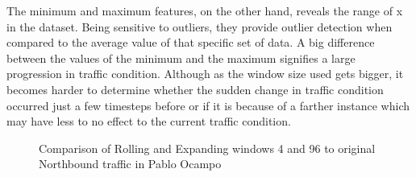
The minimum and maximum features, on the other hand, reveals the range of x in the dataset. Being sensitive to outliers, they provide outlier detection when compared to the average value of that specific set of data. A big difference between the values of the minimum and the maximum signifies a large progression in traffic condition. Although as the window size used gets bigger, it becomes harder to determine whether the sudden change in traffic condition occurred just a few timesteps before or if it is because of a farther instance which may have less to no effect to the current traffic condition. 

\begin{figure}[t] 
\centering
    \centering
      \captionsetup{justification=centering}
    \hfill
    \caption{Comparison of Rolling and Expanding windows 4 and 96 to original Northbound traffic in Pablo Ocampo}
\end{figure}

